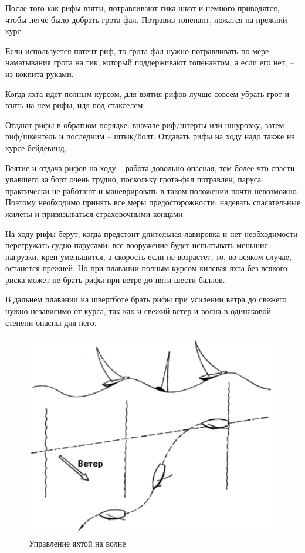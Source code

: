 \documentclass[a4paper, 12pt, twoside, final]{scrbook}
\begin{document}
После того как рифы взяты, потравливают гика-шкот и немного приводятся, чтобы легче было добрать грота-фал. Потравив топенант, ложатся на прежний курс.

Если используется патент-риф, то грота-фал нужно потравливать по мере наматывания грота на гик, который поддерживают топенантом, а если его нет, \--- из кокпита руками.

Когда яхта идет полным курсом, для взятия рифов лучше совсем убрать грот и взять на нем рифы, идя под стакселем.

Отдают рифы в обратном порядке: вначале риф\-/штерты или шнуровку, затем риф\-/шкентель и последним \--- штык\-/болт. Отдавать рифы на ходу надо также на курсе бейдевинд.

Взятие и отдача рифов на ходу \--- работа довольно опасная, тем более что спасти упавшего за борт очень трудно, поскольку грота-фал потравлен, паруса практически не работают и маневрировать в таком положении почти невозможно. Поэтому необходимо принять все меры предосторожности: надевать спасательные жилеты и привязываться страховочными концами.

На ходу рифы берут, когда предстоит длительная лавировка и нет необходимости перегружать судно парусами: все вооружение будет испытывать меньшие нагрузки, крен уменьшится, а скорость если не возрастет, то, во всяком случае, останется прежней. Но при плавании полным курсом килевая яхта без всякого риска может не брать рифы при ветре до пяти-шести баллов.

В дальнем плавании на швертботе брать рифы при усилении ветра до свежего нужно независимо от курса, так как и свежий ветер и волна в одинаковой степени опасны для него.

\begin{figure}
	\centering
	\includegraphics[scale=0.9]{116_Upravlenie_na_volne}
	\caption{Управление яхтой на волне}
	\label{fig:116}
\end{figure}
\end{document}
